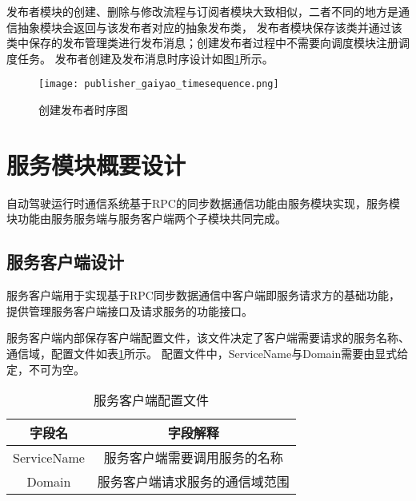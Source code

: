 发布者模块的创建、删除与修改流程与订阅者模块大致相似，二者不同的地方是通信抽象模块会返回与该发布者对应的抽象发布类，
发布者模块保存该类并通过该类中保存的发布管理类进行发布消息；创建发布者过程中不需要向调度模块注册调度任务。
发布者创建及发布消息时序设计如图\ref{publisher_gaiyao_timesequence}所示。

\begin{figure}[H]
  \centering
  \texttt{[image: publisher\_gaiyao\_timesequence.png]}
  \caption{创建发布者时序图}
  \label{publisher_gaiyao_timesequence}
\end{figure}

\section{服务模块概要设计}
自动驾驶运行时通信系统基于RPC的同步数据通信功能由服务模块实现，服务模块功能由服务服务端与服务客户端两个子模块共同完成。

\subsection{服务客户端设计}
服务客户端用于实现基于RPC同步数据通信中客户端即服务请求方的基础功能，提供管理服务客户端接口及请求服务的功能接口。

服务客户端内部保存客户端配置文件，该文件决定了客户端需要请求的服务名称、通信域，配置文件如表\ref{service_client_config_file}所示。
配置文件中，ServiceName与Domain需要由显式给定，不可为空。
\begin{table}[H]
  \centering\small
  \caption{服务客户端配置文件}
  \label{service_client_config_file}
  \begin{tabular}{cc}
    \toprule
    字段名 & 字段解释 \\
    \midrule
    ServiceName & 服务客户端需要调用服务的名称\\
    Domain & 服务客户端请求服务的通信域范围\\
    \bottomrule
  \end{tabular}
\end{table}

